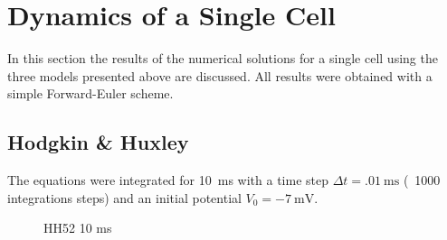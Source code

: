 \section{Dynamics of a Single Cell}
In this section the results of the numerical solutions for a single cell
using the three models presented above are discussed. All results were
obtained with a simple Forward-Euler scheme.

\subsection{Hodgkin \& Huxley}
The equations were integrated for \SI{10}{\milli\second} with a time step
$\Delta{t}=\SI{.01}{\milli\second}$ (\ie~1000 integrations steps) and an
initial potential $V_0=\SI{-7}{\milli\volt}$.

\begin{figure}[h]
    
    \label{fig:hh10ms}
    \caption{HH52 10 ms}
\end{figure}



